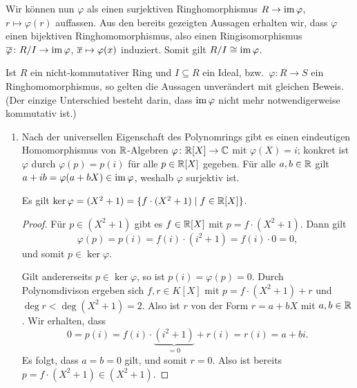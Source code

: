 Wir können nun $\varphi$ als einen surjektiven Ringhomorphismus $R \to \operatorname{im} \varphi$, $r \mapsto \varphi(r)$ auffassen.
Aus den bereits gezeigten Aussagen erhalten wir, dass $\varphi$ einen bijektiven Ringhomomorphismus, also einen Ringisomorphismus $\overline{\varphi} \colon R/I \to \operatorname{im} \varphi$, $\overline{x} \mapsto \varphi(x)$ induziert.
Somit gilt $R/I \cong \operatorname{im} \varphi$.

\begin{remark}
  Ist $R$ ein nicht-kommutativer Ring und $I \subseteq R$ ein Ideal, bzw.\ $\varphi \colon R \to S$ ein Ringhomomorphismus, so gelten die Aussagen unverändert mit gleichen Beweis.
  (Der einzige Unterschied besteht darin, dass $\operatorname{im} \varphi$ nicht mehr notwendigerweise kommutativ ist.)
\end{remark}

\begin{example}
  \begin{enumerate}
    \item
      Nach der universellen Eigenschaft des Polynomrings gibt es einen eindeutigen Homomorphismus von $\mathbb{R}$-Algebren $\varphi \colon \mathbb{R}[X] \to \mathbb{C}$ mit $\varphi(X) = i$;
      konkret ist $\varphi$ durch $\varphi(p) = p(i)$ für alle $p \in \mathbb{R}[X]$ gegeben.
      Für alle $a, b \in \mathbb{R}$ gilt $a + ib = \varphi(a + bX) \in \operatorname{im} \varphi$, weshalb $\varphi$ surjektiv ist.
      
      \begin{claim}
        Es gilt $\ker \varphi = (X^2 + 1) = \{f \cdot (X^2 + 1) \mid f \in \mathbb{R}[X]\}$.
      \end{claim}
      \begin{proof}
        Für $p \in (X^2 + 1)$ gibt es $f \in \mathbb{R}[X]$ mit $p = f \cdot (X^2 + 1)$.
        Dann gilt
        \[
            \varphi(p)
          = p(i)
          = f(i) \cdot (i^2 + 1)
          = f(i) \cdot 0
          = 0,
        \]
        und somit $p \in \ker \varphi$.
        
        Gilt andererseits $p \in \ker \varphi$, so ist $p(i) = \varphi(p) = 0$.
        Durch Polynomdivison ergeben sich $f, r \in K[X]$ mit $p = f \cdot (X^2 + 1) + r$ und $\deg r < \deg(X^2 + 1) = 2$.
        Also ist $r$ von der Form $r = a + bX$ mit $a, b \in \mathbb{R}$.
        Wir erhalten, dass
        \[
            0
          = p(i)
          = f(i) \cdot \underbrace{(i^2 + 1)}_{=0} + r(i)
          = r(i)
          = a + bi.
        \]
        Es folgt, dass $a = b = 0$ gilt, und somit $r = 0$.
        Also ist bereits $p = f \cdot (X^2 + 1) \in (X^2 + 1)$.
      \end{proof}
      

\end{enumerate}
\end{example}
